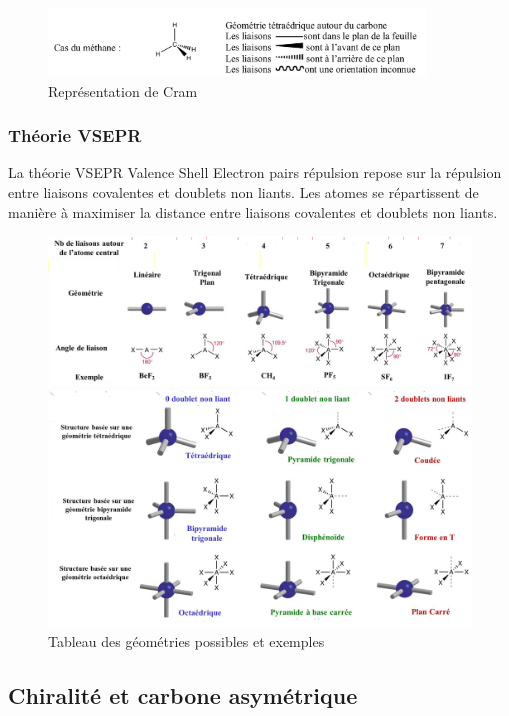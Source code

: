 \documentclass{article}%
\begin{document}
\begin{figure}
	\centerline{\includegraphics[width=10cm]{images/Cram.png}}
	\caption{Représentation de Cram}
\end{figure}

\subsubsection{Théorie VSEPR}

La théorie VSEPR \og{}Valence Shell Electron pairs répulsion\fg{} repose sur la répulsion entre liaisons covalentes et doublets non liants. Les atomes se répartissent de manière à maximiser la distance entre liaisons covalentes et doublets non liants.

\begin{figure}
	\centerline{\includegraphics[width=15cm]{images/VSEPR1.png}}
	\centerline{\includegraphics[width=15cm]{images/VSEPR2.png}}
	\caption{Tableau des géométries possibles et exemples}
\end{figure}

\subsection{Chiralité et carbone asymétrique}
\end{document}
